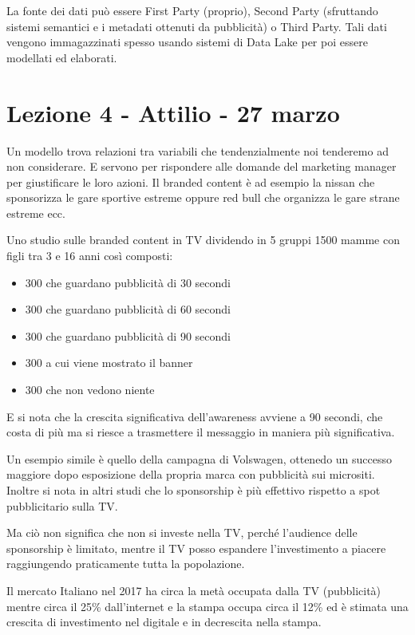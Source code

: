 \documentclass[11pt]{article}
\newenvironment{nosepitemize}{\begin{itemize}[noitemsep,topsep=0ex]}{\end{itemize}}
\begin{document}
La fonte dei dati può essere First Party (proprio), Second Party (sfruttando sistemi semantici e i metadati ottenuti da pubblicità) o Third Party. 
Tali dati vengono immagazzinati spesso usando sistemi di Data Lake per poi essere modellati ed elaborati.

\section{Lezione 4 - Attilio - 27 marzo}

Un modello trova relazioni tra variabili che tendenzialmente noi tenderemo ad non considerare. E servono per rispondere alle domande del marketing manager per giustificare le loro azioni.
Il branded content è ad esempio la nissan che sponsorizza le gare sportive estreme oppure red bull che organizza le gare strane estreme ecc.

Uno studio sulle branded content in TV dividendo in 5 gruppi 1500 mamme con figli tra 3 e 16 anni così composti:

\begin{nosepitemize}
	\item 300 che guardano pubblicità di 30 secondi
	\item 300 che guardano pubblicità di 60 secondi
	\item 300 che guardano pubblicità di 90 secondi
	\item 300 a cui viene mostrato il banner
	\item 300 che non vedono niente
\end{nosepitemize}

E si nota che la crescita significativa dell'awareness avviene a 90 secondi, che costa di più  ma si riesce a trasmettere il messaggio in maniera più significativa. 

Un esempio simile è quello della campagna di Volswagen, ottenedo un successo maggiore dopo esposizione della propria marca con pubblicità sui micrositi.
Inoltre si nota in altri studi che lo sponsorship è più effettivo rispetto a spot pubblicitario sulla TV.

Ma ciò non significa che non si investe nella TV, perché l'audience delle sponsorship è limitato, mentre il TV posso espandere l'investimento a piacere raggiungendo praticamente tutta la popolazione.

Il mercato Italiano nel 2017 ha circa la metà occupata dalla TV (pubblicità) mentre circa il 25\% dall'internet e la stampa occupa circa il 12\% ed è stimata una crescita di investimento nel digitale e in decrescita nella stampa.
\end{document}
